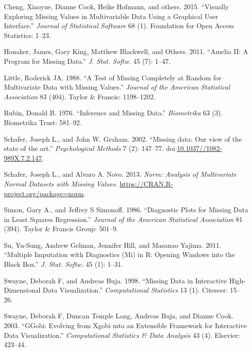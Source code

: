 \documentclass[]{article}
\begin{document}
\hypertarget{ref-cheng2015}{}
Cheng, Xiaoyue, Dianne Cook, Heike Hofmann, and others. 2015. ``Visually
Exploring Missing Values in Multivariable Data Using a Graphical User
Interface.'' \emph{Journal of Statistical Software} 68 (1). Foundation
for Open Access Statistics: 1--23.

\hypertarget{ref-Amelia}{}
Honaker, James, Gary King, Matthew Blackwell, and Others. 2011. ``Amelia
II: A Program for Missing Data.'' \emph{J. Stat. Softw.} 45 (7): 1--47.

\hypertarget{ref-Little1988}{}
Little, Roderick JA. 1988. ``A Test of Missing Completely at Random for
Multivariate Data with Missing Values.'' \emph{Journal of the American
Statistical Association} 83 (404). Taylor \& Francis: 1198--1202.

\hypertarget{ref-Rubin1976}{}
Rubin, Donald B. 1976. ``Inference and Missing Data.'' \emph{Biometrika}
63 (3). Biometrika Trust: 581--92.

\hypertarget{ref-Schafer2002}{}
Schafer, Joseph L., and John W. Graham. 2002. ``Missing data: Our view
of the state of the art.'' \emph{Psychological Methods} 7 (2): 147--77.
doi:\href{https://doi.org/10.1037//1082-989X.7.2.147}{10.1037//1082-989X.7.2.147}.

\hypertarget{ref-norm}{}
Schafer, Joseph L., and Alvaro A. Novo. 2013. \emph{Norm: Analysis of
Multivariate Normal Datasets with Missing Values}.
\url{https://CRAN.R-project.org/package=norm}.

\hypertarget{ref-simon-simonoff}{}
Simon, Gary A., and Jeffrey S Simonoff. 1986. ``Diagnostic Plots for
Missing Data in Least Squares Regression.'' \emph{Journal of the
American Statistical Association} 81 (394). Taylor \& Francis Group:
501--9.

\hypertarget{ref-mi}{}
Su, Yu-Sung, Andrew Gelman, Jennifer Hill, and Masanao Yajima. 2011.
``Multiple Imputation with Diagnostics (Mi) in R: Opening Windows into
the Black Box.'' \emph{J. Stat. Softw.} 45 (1): 1--31.

\hypertarget{ref-Swayne1998}{}
Swayne, Deborah F, and Andreas Buja. 1998. ``Missing Data in Interactive
High-Dimensional Data Visualization.'' \emph{Computational Statistics}
13 (1). Citeseer: 15--26.

\hypertarget{ref-swayne2003ggobi}{}
Swayne, Deborah F, Duncan Temple Lang, Andreas Buja, and Dianne Cook.
2003. ``GGobi: Evolving from Xgobi into an Extensible Framework for
Interactive Data Visualization.'' \emph{Computational Statistics \& Data
Analysis} 43 (4). Elsevier: 423--44.
\end{document}

